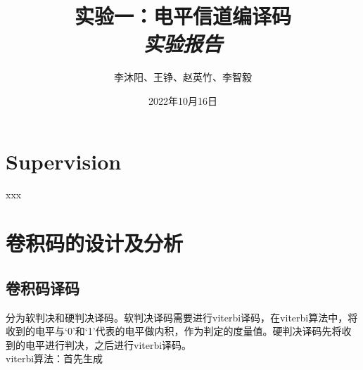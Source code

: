 \documentclass{article}
\title{\textbf{实验一：电平信道编译码}\\
        \Large \emph{实验报告}}
\author{李沐阳、王铮、赵英竹、李智毅}
\date{2022年10月16日}
\begin{document}
\maketitle
\thispagestyle{firstpage}

\section*{Supervision}

xxx

\section*{卷积码的设计及分析}

\subsection*{卷积码译码}
分为软判决和硬判决译码。软判决译码需要进行viterbi译码，在viterbi算法中，将收到的电平与‘0’和‘1’代表的电平做内积，作为判定的度量值。硬判决译码先将收到的电平进行判决，之后进行viterbi译码。\\
viterbi算法：首先生成



\end{document}
